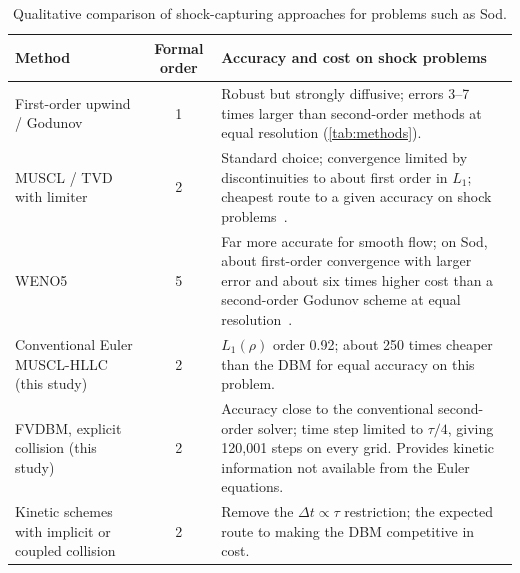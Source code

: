 \begin{table}[H]
\centering
\caption{Qualitative comparison of shock-capturing approaches for problems such as Sod.}
\label{tab:literature}
\small
\begin{tabularx}{\textwidth}{@{}p{3.3cm}cX@{}}
\toprule
Method & Formal order & Accuracy and cost on shock problems \\
\midrule
First-order upwind / Godunov & 1 & Robust but strongly diffusive; errors 3--7 times larger than
  second-order methods at equal resolution (\cref{tab:methods}). \\
MUSCL / TVD with limiter~\citep{vanLeer1979,Sweby1984} & 2 & Standard choice; convergence limited
  by discontinuities to about first order in $L_1$; cheapest route to a given accuracy on
  shock problems~\citep{Greenough2004}. \\
WENO5~\citep{JiangShu1996} & 5 & Far more accurate for smooth flow; on Sod, about first-order
  convergence with larger error and about six times higher cost than a second-order Godunov
  scheme at equal resolution~\citep{Greenough2004}. \\
Conventional Euler MUSCL-HLLC (this study) & 2 & $L_1(\rho)$ order 0.92; about 250 times cheaper
  than the DBM for equal accuracy on this problem. \\
FVDBM, explicit collision (this study) & 2 & Accuracy close to the conventional second-order
  solver; time step limited to $\tau/4$, giving 120{,}001 steps on every grid.  Provides kinetic
  information not available from the Euler equations. \\
Kinetic schemes with implicit or coupled collision~\citep{PareschiRusso2005,Guo2013} & 2 &
  Remove the $\Delta t \propto \tau$ restriction; the expected route to making the DBM
  competitive in cost. \\
\bottomrule
\end{tabularx}
\end{table}
